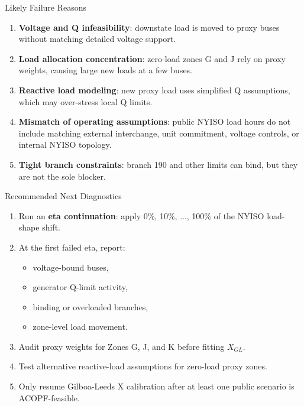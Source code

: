 \documentclass[aspectratio=169,10pt]{beamer}
\begin{document}
\begin{frame}{Likely Failure Reasons}
\begin{enumerate}
  \item \textbf{Voltage and Q infeasibility}: downstate load is moved to proxy buses without matching detailed voltage support.
  \item \textbf{Load allocation concentration}: zero-load zones G and J rely on proxy weights, causing large new loads at a few buses.
  \item \textbf{Reactive load modeling}: new proxy load uses simplified Q assumptions, which may over-stress local Q limits.
  \item \textbf{Mismatch of operating assumptions}: public NYISO load hours do not include matching external interchange, unit commitment, voltage controls, or internal NYISO topology.
  \item \textbf{Tight branch constraints}: branch 190 and other limits can bind, but they are not the sole blocker.
\end{enumerate}
\end{frame}

\begin{frame}{Recommended Next Diagnostics}
\begin{enumerate}
  \item Run an \textbf{eta continuation}: apply 0\%, 10\%, ..., 100\% of the NYISO load-shape shift.
  \item At the first failed eta, report:
    \begin{itemize}
      \item voltage-bound buses,
      \item generator Q-limit activity,
      \item binding or overloaded branches,
      \item zone-level load movement.
    \end{itemize}
  \item Audit proxy weights for Zones G, J, and K before fitting $X_{GL}$.
  \item Test alternative reactive-load assumptions for zero-load proxy zones.
  \item Only resume Gilboa-Leeds X calibration after at least one public scenario is ACOPF-feasible.
\end{enumerate}
\end{frame}
\end{document}
